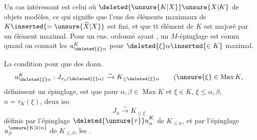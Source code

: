Un cas intéressant est celui où $\deleted{\unsure{K|X}}\unsure{X|K}$   de  objets modèles, ce qui signifie que l'ens des éléments maximaux de $K\inserted{=\unsure{\widetilde X|X}}$ est fini, et que tt élément de $K$ est majoré par un élément maximal. Pour un ens. ordonné ayant   , un $M$-épinglage est connu quand on connait les $u^K_{\deleted{\xi}\alpha}$ pour $\deleted{\xi}\alpha\inserted{\in K}$\unsure{(|,} maximal.

La condition pour que des donn.
\[
u^K_{\deleted{\xi}\alpha}: J_{\tau_n(\deleted{\xi}\alpha)}
   \xrightarrow{\sim} K_{\leq\deleted{\xi}\alpha}\qquad
   (\unsure{\xi}\in\operatorname{Max}K,
\]
définissent un épinglage, est que pour  $\alpha,\beta\in\operatorname{Max}K$ et $\xi\in K$, $\xi\leq\alpha,\beta$,  $n=\tau_K(\xi)$,  deux iso
\[
J_n\xrightarrow{\sim}K_{\leq\xi}
\]
définis par l'épinglage  ${\deleted{\unsure{\tau}}u}^K_\alpha$ de $K_{\leq\alpha}$, et par l'épinglage $u^{\unsure{K|k|n}}_\beta$ de $K_{\leq\beta}$,  les .
